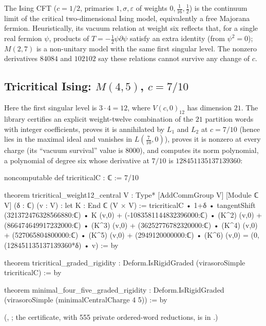 \begin{physics}
The Ising CFT ($c=1/2$, primaries $1,\sigma,\varepsilon$ of weights $0,\frac1{16},\frac12$) is the continuum limit of the
critical two-dimensional Ising model, equivalently a free Majorana fermion. Heuristically, its vacuum relation at weight six
reflects that, for a single real fermion $\psi$, products of $T=-\frac12\psi\partial\psi$ satisfy an extra identity (from
$\psi^2=0$); $M(2,7)$ is a non-unitary model with the same first singular level. The nonzero derivatives
$84084$ and $102102$ say these relations cannot survive any change of $c$.
\end{physics}

\subsection{Tricritical Ising: \texorpdfstring{$M(4,5)$, $c = 7/10$}{M(4,5), c = 7/10}}

Here the first singular level is $3\cdot4 = 12$, where $V(c,0)_{12}$ has dimension $21$. The library certifies an
explicit weight-twelve combination of the $21$ partition words with integer coefficients, proves it is
annihilated by $L_1$ and $L_2$ at $c = 7/10$ (hence lies in the maximal ideal and vanishes in $L(\frac7{10},0)$),
proves it is nonzero at every charge (its ``vacuum survival'' value is $8000$), and computes its norm
polynomial, a polynomial of degree six whose derivative at $7/10$ is $128451135137139360$:
\begin{leancode}
noncomputable def tricriticalC : ℂ := 7/10

theorem tricritical_weight12_central {V : Type*} [AddCommGroup V] [Module ℂ V]
    (δ : ℂ) (v : V) :
    let K : End ℂ (V × V) := tricriticalC • 1+δ • tangentShift
    (321372476328566880:ℂ) • K (v,0) +
      (-1083581144832396000:ℂ) • (K^2) (v,0) +
      (866474649917232000:ℂ) • (K^3) (v,0) +
      (36252776782320000:ℂ) • (K^4) (v,0) +
      (527065804800000:ℂ) • (K^5) (v,0) +
      (2949120000000:ℂ) • (K^6) (v,0) = (0,(128451135137139360*δ) • v) := by

theorem tricritical_graded_rigidity : Deform.IsRigidGraded (virasoroSimple tricriticalC) := by

theorem minimal_four_five_graded_rigidity :
    Deform.IsRigidGraded (virasoroSimple (minimalCentralCharge 4 5)) := by
\end{leancode}
(, ; the certificate,
with 555 private ordered-word reductions, is in .)


